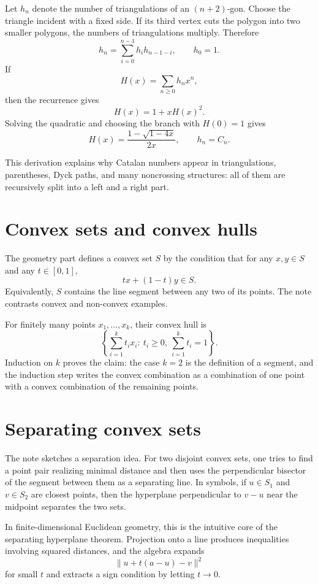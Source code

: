 Let $h_n$ denote the number of triangulations of an $(n+2)$-gon.  Choose the triangle incident with a fixed side.  If its third vertex cuts the polygon into two smaller polygons, the numbers of triangulations multiply.  Therefore
\[
  h_n=\sum_{i=0}^{n-1}h_i h_{n-1-i},\qquad h_0=1.
\]
If
\[
  H(x)=\sum_{n\ge0}h_nx^n,
\]
then the recurrence gives
\[
  H(x)=1+xH(x)^2.
\]
Solving the quadratic and choosing the branch with $H(0)=1$ gives
\[
  H(x)=\frac{1-\sqrt{1-4x}}{2x},\qquad
  h_n=C_n.
\]

This derivation explains why Catalan numbers appear in triangulations, parentheses, Dyck paths, and many noncrossing structures: all of them are recursively split into a left and a right part.

\section{Convex sets and convex hulls}

The geometry part defines a convex set $S$ by the condition that for any $x,y\in S$ and any $t\in[0,1]$,
\[
  tx+(1-t)y\in S.
\]
Equivalently, $S$ contains the line segment between any two of its points.  The note contrasts convex and non-convex examples.

For finitely many points $x_1,\ldots,x_k$, their convex hull is
\[
  \left\{\sum_{i=1}^k t_ix_i:\ t_i\ge0,\ \sum_{i=1}^k t_i=1\right\}.
\]
Induction on $k$ proves the claim: the case $k=2$ is the definition of a segment, and the induction step writes the convex combination as a combination of one point with a convex combination of the remaining points.

\section{Separating convex sets}

The note sketches a separation idea.  For two disjoint convex sets, one tries to find a point pair realizing minimal distance and then uses the perpendicular bisector of the segment between them as a separating line.  In symbols, if $u\in S_1$ and $v\in S_2$ are closest points, then the hyperplane perpendicular to $v-u$ near the midpoint separates the two sets.

In finite-dimensional Euclidean geometry, this is the intuitive core of the separating hyperplane theorem.  Projection onto a line produces inequalities involving squared distances, and the algebra expands
\[
  \|u+t(a-u)-v\|^2
\]
for small $t$ and extracts a sign condition by letting $t\to0$.

